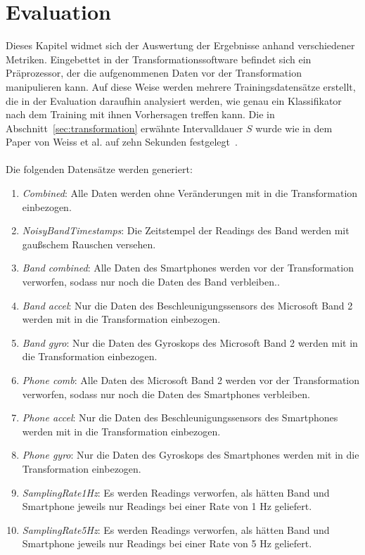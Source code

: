 \chapter{Evaluation}
\label{chap:evaluation}

Dieses Kapitel widmet sich der Auswertung der Ergebnisse anhand verschiedener Metriken. Eingebettet in der Transformationssoftware befindet sich ein Präprozessor, der die aufgenommenen Daten vor der Transformation manipulieren kann. Auf diese Weise werden mehrere Trainingsdatensätze erstellt, die in der Evaluation daraufhin analysiert werden, wie genau ein Klassifikator nach dem Training mit ihnen Vorhersagen treffen kann. Die in Abschnitt~\ref{sec:transformation} erwähnte Intervalldauer $S$ wurde wie in dem Paper von Weiss et al. auf zehn Sekunden festgelegt~\cite{Weiss2016}.
\\\\
Die folgenden Datensätze werden generiert:

\begin{enumerate}
\item \textit{Combined}: Alle Daten werden ohne Veränderungen mit in die Transformation einbezogen.
\item \textit{NoisyBandTimestamps}: Die Zeitstempel der Readings des Band werden mit gaußschem Rauschen versehen.
\item \textit{Band combined}: Alle Daten des Smartphones werden vor der Transformation verworfen, sodass nur noch die Daten des Band verbleiben..
\item \textit{Band accel}: Nur die Daten des Beschleunigungssensors des Microsoft Band 2 werden mit in die Transformation einbezogen.
\item \textit{Band gyro}: Nur die Daten des Gyroskops des Microsoft Band 2 werden mit in die Transformation einbezogen.
\item \textit{Phone comb}: Alle Daten des Microsoft Band 2 werden vor der Transformation verworfen, sodass nur noch die Daten des Smartphones verbleiben.
\item \textit{Phone accel}: Nur die Daten des Beschleunigungssensors des Smartphones werden mit in die Transformation einbezogen.
\item \textit{Phone gyro}: Nur die Daten des Gyroskops des Smartphones werden mit in die Transformation einbezogen.
\item \textit{SamplingRate1Hz}: Es werden Readings verworfen, als hätten Band und Smartphone jeweils nur Readings bei einer Rate von 1 Hz geliefert.
\item \textit{SamplingRate5Hz}: Es werden Readings verworfen, als hätten Band und Smartphone jeweils nur Readings bei einer Rate von 5 Hz geliefert.
\end{enumerate}

